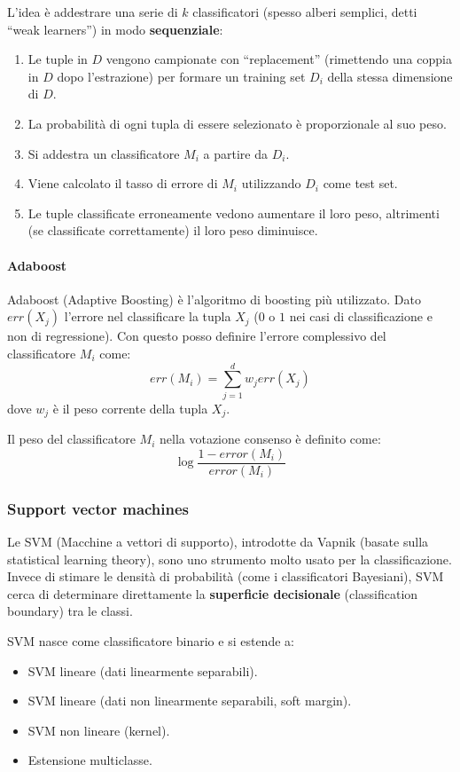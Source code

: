 L'idea è addestrare una serie di $k$ classificatori (spesso alberi semplici,
detti ``weak learners'') in modo \textbf{sequenziale}:
\begin{enumerate}
    \item Le tuple in $D$ vengono campionate con ``replacement'' (rimettendo
        una coppia in $D$ dopo l'estrazione) per formare un training set $D_i$
        della stessa dimensione di $D$.
    \item La probabilità di ogni tupla di essere selezionato è proporzionale
    al suo peso.
    \item Si addestra un classificatore $M_i$ a partire da $D_i$.
    \item Viene calcolato il tasso di errore di $M_i$ utilizzando $D_i$ come
    test set.
    \item Le tuple classificate erroneamente vedono aumentare il loro peso,
    altrimenti (se classificate correttamente) il loro peso diminuisce.
\end{enumerate}

\paragraph{Adaboost}
Adaboost (Adaptive Boosting) è l'algoritmo di boosting più utilizzato.
Dato $err(X_j)$ l'errore nel classificare la tupla $X_j$ ($0$ o $1$
nei casi di classificazione e non di regressione). Con questo posso definire
l'errore complessivo del classificatore $M_i$ come:
\[
err(M_i) = \sum_{j=1}^{d} w_j err(X_j)
\]
dove $w_j$ è il peso corrente della tupla $X_j$.

Il peso del classificatore $M_i$ nella votazione consenso è definito come:
\[
\log{\frac{1- error(M_i)}{error(M_i)}}
\]


\subsubsection{Support vector machines}

Le SVM (Macchine a vettori di supporto), introdotte da Vapnik (basate sulla
statistical learning theory), sono uno strumento molto usato per la
classificazione.
Invece di stimare le densità di probabilità (come i classificatori Bayesiani),
SVM cerca di determinare direttamente la \textbf{superficie decisionale}
(classification boundary) tra le classi.

SVM nasce come classificatore binario e si estende a:
\begin{itemize}
    \item SVM lineare (dati linearmente separabili).
    \item SVM lineare (dati non linearmente separabili, soft margin).
    \item SVM non lineare (kernel).
    \item Estensione multiclasse.
\end{itemize}

